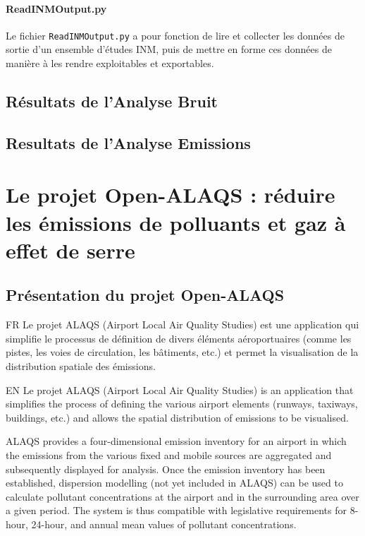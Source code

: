 \documentclass[a4paper]{article}
\newcommand{\code}[1]{\texttt{#1}}
\begin{document}
    \paragraph{ReadINMOutput.py}
    Le fichier \code{ReadINMOutput.py} a pour fonction de lire et collecter les données de sortie d'un ensemble d'études INM, puis de mettre en forme ces données de manière à les rendre exploitables et exportables.
    
    \subsection{Résultats de l'Analyse Bruit}
    \subsection{Resultats de l'Analyse Emissions}
    \newpage
    
    \section{Le projet Open-ALAQS : réduire les émissions de polluants et gaz à effet de serre}
    \subsection{Présentation du projet Open-ALAQS}
    FR Le projet ALAQS (Airport Local Air Quality Studies) est une application qui simplifie le processus de définition de divers éléments aéroportuaires (comme les pistes, les voies de circulation, les bâtiments, etc.) et permet la visualisation de la distribution spatiale des émissions.
    
    EN Le projet ALAQS (Airport Local Air Quality Studies) is an application that simplifies the process of defining the various airport elements (runways, taxiways, buildings, etc.) and allows the spatial distribution of emissions to be visualised.
    
    ALAQS provides a four-dimensional emission inventory for an airport in which the emissions from the various fixed and mobile sources are aggregated and subsequently displayed for analysis. Once the emission inventory has been established, dispersion modelling (not yet included in ALAQS) can be used to calculate pollutant concentrations at the airport and in the surrounding area over a given period. The system is thus compatible with legislative requirements for 8-hour, 24-hour, and annual mean values of pollutant concentrations.
    
\end{document}
